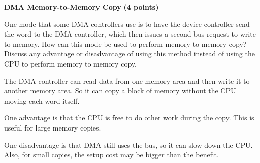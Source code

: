 \documentclass[10pt,answers]{exam}
\newcommand{\qpoints}[1]{\hfill \textbf{(#1 points)}}
\begin{document}
\begin{questions}
\question \textbf{DMA Memory-to-Memory Copy} \qpoints{4}

One mode that some DMA controllers use is to have the device controller send the word to the DMA controller, which then issues a second bus request to write to memory. How can this mode be used to perform memory to memory copy? Discuss any advantage or disadvantage of using this method instead of using the CPU to perform memory to memory copy.

\begin{solution}
The DMA controller can read data from one memory area and then write it to another memory area.
So it can copy a block of memory without the CPU moving each word itself.

One advantage is that the CPU is free to do other work during the copy.
This is useful for large memory copies.

One disadvantage is that DMA still uses the bus, so it can slow down the CPU.
Also, for small copies, the setup cost may be bigger than the benefit.
\end{solution}

\end{questions}
\end{document}
